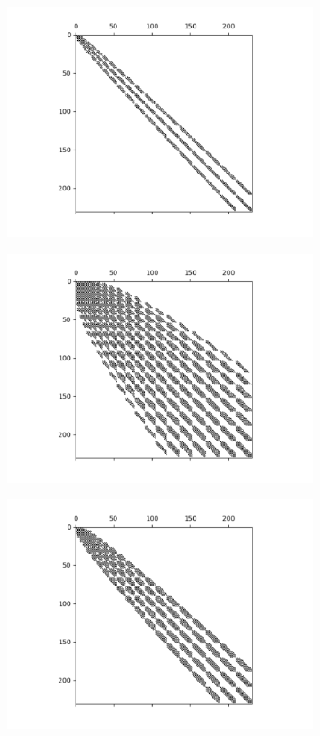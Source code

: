 \documentclass[11pt, oneside]{article}   	%
\begin{document}
\begin{figure}[t]
	\begin{subfigure}{0.32\textwidth}
	\includegraphics[scale=0.35]{sparsityoflaplacian-w11}
	\end{subfigure}
	\begin{subfigure}{0.32\textwidth}
	\includegraphics[scale=0.35]{sparsityofhelmholtz}
	\end{subfigure}
	\begin{subfigure}{0.32\textwidth}
	\includegraphics[scale=0.35]{sparsityofbiharmonic}

\end{subfigure}
\end{figure}
\end{document}
